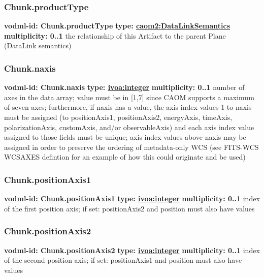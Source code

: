     \subsubsection{Chunk.productType}
      \textbf{vodml-id: Chunk.productType} \newline
      \textbf{type: \hyperref[sect:DataLinkSemantics]{caom2:DataLinkSemantics}} \newline
      \textbf{multiplicity: 0..1} \newline
      the relationship of this Artifact to the parent Plane (DataLink semantics)

    \subsubsection{Chunk.naxis}
      \textbf{vodml-id: Chunk.naxis} \newline
      \textbf{type: \hyperref[sect:ivoa]{ivoa:integer}} \newline
      \textbf{multiplicity: 0..1} \newline
      number of axes in the data array; value must be in [1,7] since CAOM supports a maximum of seven axes; furthermore, if naxis has a value, the axis index values 1 to {naxis} must be assigned (to positionAxis1, positionAxis2, energyAxis, timeAxis, polarizationAxis, customAxis, and/or observableAxis) and each axis index value assigned to those fields must be unique; axis index values above {naxis} may be assigned in order to preserve the ordering of metadata-only WCS (see FITS-WCS WCSAXES defintion for an example of how this could originate and be used)

    \subsubsection{Chunk.positionAxis1}
      \textbf{vodml-id: Chunk.positionAxis1} \newline
      \textbf{type: \hyperref[sect:ivoa]{ivoa:integer}} \newline
      \textbf{multiplicity: 0..1} \newline
      index of the first position axis; if set: positionAxis2 and position must also have values

    \subsubsection{Chunk.positionAxis2}
      \textbf{vodml-id: Chunk.positionAxis2} \newline
      \textbf{type: \hyperref[sect:ivoa]{ivoa:integer}} \newline
      \textbf{multiplicity: 0..1} \newline
      index of the second position axis; if set: positionAxis1 and position must also have values

